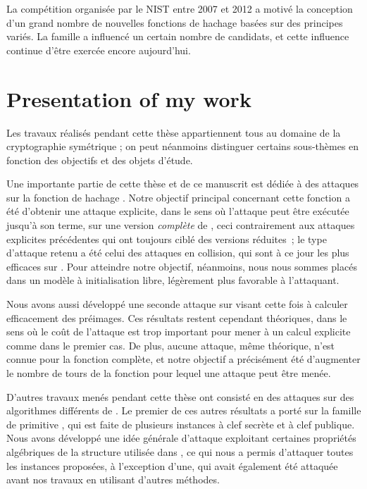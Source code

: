 La compétition \shathree organisée par le NIST entre 2007 et 2012 a motivé la conception d'un grand nombre de nouvelles fonctions
de hachage basées sur des principes variés.
La famille \mdsha a influencé un certain nombre de candidats, et cette influence continue d'être exercée encore aujourd'hui.

\chapter[Présentation de mes travaux]{Presentation of my work}

Les travaux réalisés pendant cette thèse appartiennent tous au domaine de la cryptographie symétrique ; on peut néanmoins distinguer certains sous-thèmes en fonction des objectifs et des objets d'étude.

\medskip

Une importante partie de cette thèse et de ce manuscrit est dédiée à des attaques sur la fonction de hachage \shaone. Notre objectif principal concernant cette fonction a été d'obtenir
une attaque explicite, dans le sens où l'attaque peut être exécutée jusqu'à son terme, sur une version \emph{complète} de \shaone, ceci
contrairement aux attaques explicites précédentes
qui ont toujours ciblé des versions réduites~; le type d'attaque retenu a été celui des attaques en collision, qui sont à ce jour les plus efficaces sur \shaone.
Pour atteindre notre objectif, néanmoins, nous nous sommes placés dans un modèle à initialisation libre, légèrement plus favorable à l'attaquant.

Nous avons aussi développé une seconde attaque sur \shaone visant cette fois à calculer efficacement des préimages. Ces résultats restent cependant théoriques, dans le sens où le coût
de l'attaque est trop important pour mener à un calcul explicite comme dans le premier cas. De plus, aucune attaque, même théorique,  n'est connue pour la fonction complète, et notre
objectif a précisément été d'augmenter le nombre de tours de la fonction pour lequel une attaque peut être menée.

\medskip

D'autres travaux menés pendant cette thèse ont consisté en des attaques sur des algorithmes différents de \shaone. Le premier de ces autres résultats a porté sur la famille de primitive
\asasa, qui est faite de plusieurs instances à clef secrète et à clef publique. Nous avons développé une idée générale d'attaque exploitant certaines propriétés algébriques de la
structure utilisée dans \asasa, ce qui nous a permis d'attaquer toutes les instances proposées, à l'exception d'une, qui avait également été attaquée avant nos travaux en utilisant
d'autres méthodes.

